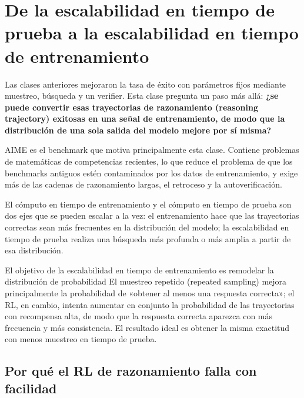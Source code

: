 \section{De la escalabilidad en tiempo de prueba a la escalabilidad en tiempo de entrenamiento}

Las clases anteriores mejoraron la tasa de éxito con parámetros fijos mediante muestreo, búsqueda y un verifier. Esta clase pregunta un paso más allá: \textbf{¿se puede convertir esas trayectorias de razonamiento (reasoning trajectory) exitosas en una señal de entrenamiento, de modo que la distribución de una sola salida del modelo mejore por sí misma?}

AIME es el benchmark que motiva principalmente esta clase. Contiene problemas de matemáticas de competencias recientes, lo que reduce el problema de que los benchmarks antiguos estén contaminados por los datos de entrenamiento, y exige más de las cadenas de razonamiento largas, el retroceso y la autoverificación.


El cómputo en tiempo de entrenamiento y el cómputo en tiempo de prueba son dos ejes que se pueden escalar a la vez: el entrenamiento hace que las trayectorias correctas sean más frecuentes en la distribución del modelo; la escalabilidad en tiempo de prueba realiza una búsqueda más profunda o más amplia a partir de esa distribución.


\begin{importantbox}{El objetivo de la escalabilidad en tiempo de entrenamiento es remodelar la distribución de probabilidad}
El muestreo repetido (repeated sampling) mejora principalmente la probabilidad de «obtener al menos una respuesta correcta»; el RL, en cambio, intenta aumentar en conjunto la probabilidad de las trayectorias con recompensa alta, de modo que la respuesta correcta aparezca con más frecuencia y más consistencia. El resultado ideal es obtener la misma exactitud con menos muestreo en tiempo de prueba.
\end{importantbox}

\subsection{Por qué el RL de razonamiento falla con facilidad}

